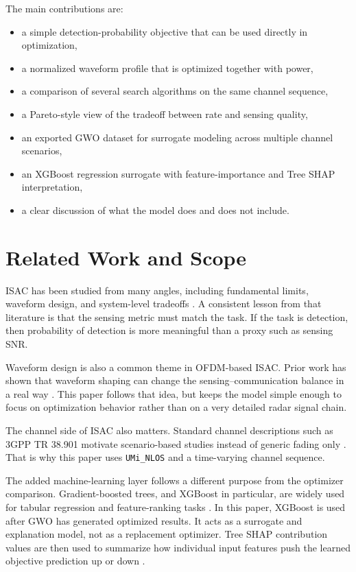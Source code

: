 \documentclass[runningheads]{llncs}
\begin{document}
The main contributions are:
\begin{itemize}
  \item a simple detection-probability objective that can be used directly in optimization,
  \item a normalized waveform profile that is optimized together with power,
  \item a comparison of several search algorithms on the same channel sequence,
  \item a Pareto-style view of the tradeoff between rate and sensing quality,
  \item an exported GWO dataset for surrogate modeling across multiple channel scenarios,
  \item an XGBoost regression surrogate with feature-importance and Tree SHAP interpretation,
  \item a clear discussion of what the model does and does not include.
\end{itemize}

\section{Related Work and Scope}
ISAC has been studied from many angles, including fundamental limits, waveform design, and system-level tradeoffs \cite{liu2022isacsurvey,ouyang2023mi}. A consistent lesson from that literature is that the sensing metric must match the task. If the task is detection, then probability of detection is more meaningful than a proxy such as sensing SNR.

Waveform design is also a common theme in OFDM-based ISAC. Prior work has shown that waveform shaping can change the sensing--communication balance in a real way \cite{liyanarachchi2021waveforms}. This paper follows that idea, but keeps the model simple enough to focus on optimization behavior rather than on a very detailed radar signal chain.

The channel side of ISAC also matters. Standard channel descriptions such as 3GPP TR 38.901 motivate scenario-based studies instead of generic fading only \cite{3gpp38901}. That is why this paper uses \texttt{UMi\_NLOS} and a time-varying channel sequence.

The added machine-learning layer follows a different purpose from the optimizer comparison. Gradient-boosted trees, and XGBoost in particular, are widely used for tabular regression and feature-ranking tasks \cite{chen2016xgboost}. In this paper, XGBoost is used after GWO has generated optimized results. It acts as a surrogate and explanation model, not as a replacement optimizer. Tree SHAP contribution values are then used to summarize how individual input features push the learned objective prediction up or down \cite{lundberg2017shap}.
\end{document}
